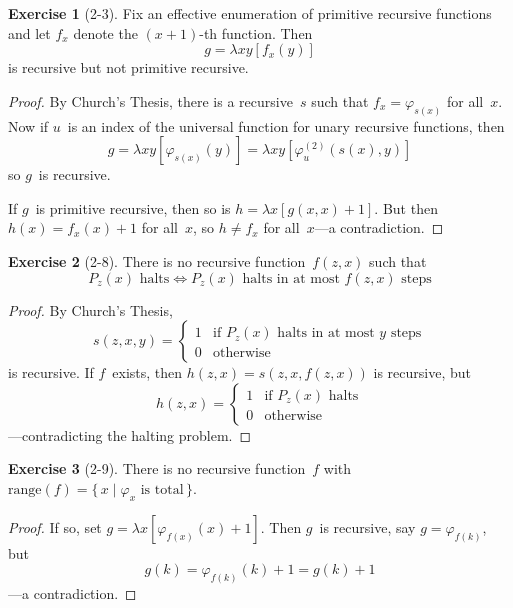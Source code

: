 \documentclass[letterpaper]{article}
\newcommand{\ran}{\mathrm{range}}
\theoremstyle{definition}
\newtheorem*{exer}{Exercise}
\theoremstyle{remark}
\theoremstyle{direction}
\begin{document}
\begin{exer}[2-3]
Fix an effective enumeration of primitive recursive functions and let $f_x$ denote the $(x+1)$-th function. Then
$$g=\lambda xy[f_x(y)]$$
is recursive but not primitive recursive.
\end{exer}
\begin{proof}
By Church's Thesis, there is a recursive~$s$ such that $f_x=\varphi_{s(x)}$ for all~$x$. Now if $u$~is an index of the universal function for unary recursive functions, then
$$g=\lambda xy[\varphi_{s(x)}(y)]=\lambda xy[\varphi_u^{(2)}(s(x),y)]$$
so $g$~is recursive.

If $g$~is primitive recursive, then so is $h=\lambda x[g(x,x)+1]$. But then $h(x)=f_x(x)+1$ for all~$x$, so $h\ne f_x$ for all~$x$---a contradiction.
\end{proof}

\begin{exer}[2-8]
There is no recursive function~$f(z,x)$ such that
$$P_z(x)\text{ halts}\iff P_z(x)\text{ halts in at most }f(z,x)\text{ steps}$$
\end{exer}
\begin{proof}
By Church's Thesis,
$$s(z,x,y)=
\begin{cases}
1&\text{if }P_z(x)\text{ halts in at most }y\text{ steps}\\
0&\text{otherwise}
\end{cases}$$
is recursive. If $f$~exists, then $h(z,x)=s(z,x,f(z,x))$ is recursive, but
$$h(z,x)=
\begin{cases}
1&\text{if }P_z(x)\text{ halts}\\
0&\text{otherwise}
\end{cases}$$
---contradicting the halting problem.
\end{proof}

\begin{exer}[2-9]
There is no recursive function~$f$ with $\ran(f)=\{\,x\mid\varphi_x\text{ is total}\,\}$.
\end{exer}
\begin{proof}
If so, set $g=\lambda x[\varphi_{f(x)}(x)+1]$. Then $g$~is recursive, say $g=\varphi_{f(k)}$, but
$$g(k)=\varphi_{f(k)}(k)+1=g(k)+1$$
---a contradiction.
\end{proof}
\end{document}
